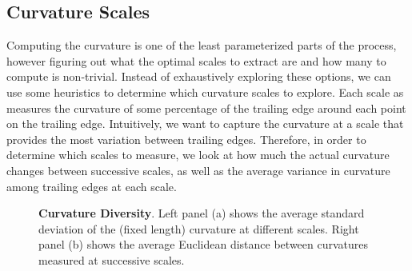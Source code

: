 \subsection{Curvature Scales}

Computing the curvature is one of the least parameterized parts of the process, however figuring out what the optimal scales to extract are and how many to compute is non-trivial.
Instead of exhaustively exploring these options, we can use some heuristics to determine which curvature scales to explore.
Each scale as measures the curvature of some percentage of the trailing edge around each point on the trailing edge.
Intuitively, we want to capture the curvature at a scale that provides the most variation between trailing edges.
Therefore, in order to determine which scales to measure, we look at how much the actual curvature changes between successive scales, as well as the average variance in curvature among trailing edges at each scale. 

\begin{figure}[t]%
\centering
{}
%
\caption{\textbf{Curvature Diversity}. Left panel (a) shows the average standard deviation of the (fixed length) curvature at different scales. Right panel (b) shows the average Euclidean distance between curvatures measured at successive scales.}
\label{fig:curvature_diversity}
\end{figure}

